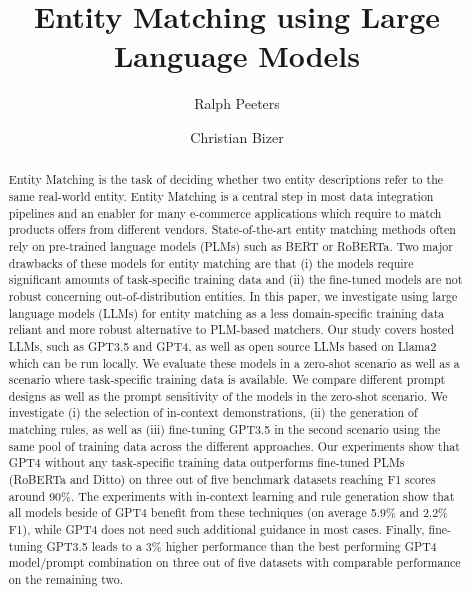 \documentclass[sigconf,nonacm]{acmart}
\begin{document}
\title{Entity Matching using Large Language Models}

\author{Ralph Peeters}

\author{Christian Bizer}

\renewcommand{\shortauthors}{Peeters and Bizer}



\begin{abstract}
Entity Matching is the task of deciding whether two entity descriptions refer to the same real-world entity. Entity Matching is a central step in most data integration pipelines and an enabler for many e-commerce applications which require to match products offers from different vendors. State-of-the-art entity matching methods often rely on pre-trained language models (PLMs) such as BERT or RoBERTa. Two major drawbacks of these models for entity matching are that (i) the models require significant amounts of task-specific training data and (ii) the fine-tuned models are not robust concerning out-of-distribution entities. In this paper, we investigate using large language models (LLMs) for entity matching as a less domain-specific training data reliant and more robust alternative to PLM-based matchers. Our study covers hosted LLMs, such as GPT3.5 and GPT4, as well as open source LLMs based on Llama2 which can be run locally. We evaluate these models in a zero-shot scenario as well as a scenario where task-specific training data is available. We compare different prompt designs as well as the prompt sensitivity of the models in the zero-shot scenario. We investigate (i) the selection of in-context demonstrations, (ii) the generation of matching rules, as well as (iii) fine-tuning GPT3.5 in the second scenario using the same pool of training data across the different approaches. Our experiments show that GPT4 without any task-specific training data outperforms fine-tuned PLMs (RoBERTa and Ditto) on three out of five benchmark datasets reaching F1 scores around 90\%. The experiments with in-context learning and rule generation show that all models beside of GPT4 benefit from these techniques (on average 5.9\% and 2.2\% F1), while GPT4 does not need such additional guidance in most cases. Finally, fine-tuning GPT3.5 leads to a 3\% higher performance than the best performing GPT4 model/prompt combination on three out of five datasets with comparable performance on the remaining two.
\end{abstract}
\end{document}
